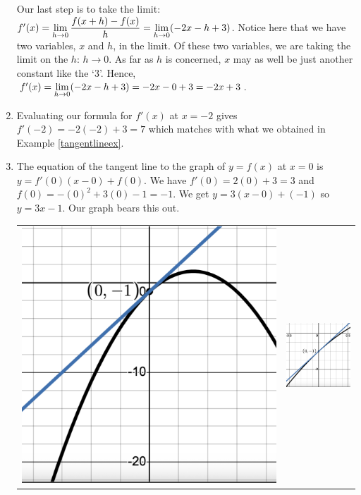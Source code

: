 \documentclass{ximera}
\begin{document}
\begin{ex}
\begin{enumerate}
Our last step is to take the limit:   $f'(x) = \ds{ \lim_{h \rightarrow 0} \dfrac{f(x+h) - f(x)}{h} = \lim_{h \rightarrow 0} (-2x-h+3)}$.  Notice here that we have two variables, $x$ and $h$, in the limit.  Of these two variables, we are taking the limit on the $h$:  $h \rightarrow 0$.  As far as $h$ is concerned, $x$ may as well be just another constant like the `$3$'.  Hence, $f'(x) = \ds{ \lim_{h \rightarrow 0} (-2x-h+3)}=  -2x - 0 + 3 = -2x+3$.

\item  Evaluating our formula for $f'(x)$ at $x = -2$ gives $f'(-2) = -2(-2) + 3 = 7$ which matches with what we obtained in Example \ref{tangentlineex}.

\item The equation of the tangent line to the graph of $y = f(x)$ at $x = 0$ is $y = f'(0) (x - 0) + f(0)$.  We have $f'(0)=2(0) + 3 = 3$ and $f(0) = -(0)^2+3(0)-1 = -1$.  We get $y = 3(x-0)+(-1)$ so $y = 3x-1$. Our graph bears this out.

\begin{center}

\begin{tabular}{cc}

 \includegraphics[width=2.5 in]{./IntroductiontoDerivativesGraphics/TL02.png} &  \includegraphics[width=2.5in]{./IntroductiontoDerivativesGraphics/TL02Zoom.png}  \\
 

\end{tabular}
\end{center}
\end{enumerate}
\end{ex}
\end{document}
